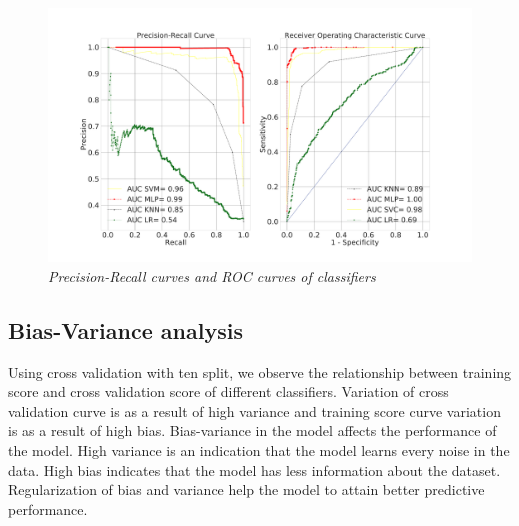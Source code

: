 \documentclass[final,5p,times,twocolumn,authoryear]{elsarticle}
\begin{document}
\begin{figure}[H]
	\centering
	\includegraphics[width=1.2\linewidth]{Figures/ROC&PR}
	\caption{\textit{Precision-Recall curves and ROC curves of classifiers} }
\label{fig:rocall}
\end{figure}

 \subsection{Bias-Variance analysis}
Using cross validation with ten split, we observe the relationship between training score and cross validation score of different classifiers. Variation of cross validation curve is as a result of high variance and training score curve variation is as a result of high bias. Bias-variance in the model affects the performance of the model. High variance is an indication that the model learns every noise in the data. High bias indicates that the model has less information about the dataset. Regularization of bias and variance help the model to attain better predictive performance. 
\end{document}

